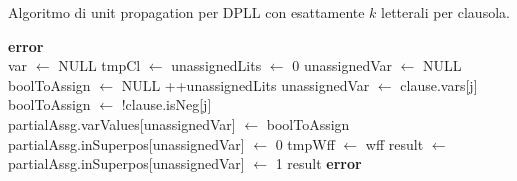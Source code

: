 \begin{algorithm}[H]
    \caption{Algoritmo di unit propagation per DPLL con esattamente $k$ letterali per clausola.}
    \label{alg:unit_propagation_second_approach}
    \begin{algorithmic}[1]
                \State \textbf{error}
            \EndIf\\
            
            \State var $\gets$ NULL
            \State tmpCl $\gets$ 
                    \State unassignedLits $\gets$ 0
                    \State unassignedVar $\gets$ NULL
                    \State boolToAssign $\gets$ NULL
                            \State ++unassignedLits
                            \State unassignedVar $\gets$ clause.vars[j]
                            \State boolToAssign $\gets$ !clause.isNeg[j]
                        \EndIf
                    \EndFor\\
                    
                        \State partialAssg.varValues[unassignedVar] $\gets$ boolToAssign
                        \State partialAssg.inSuperpos[unassignedVar] $\gets$ 0
                        \State tmpWff $\gets$ wff
                        \State {}
                        \State result $\gets$ 
                        \State partialAssg.inSuperpos[unassignedVar] $\gets$ 1
                        \State \Return result
                    \EndIf
                \EndIf
                \State {}
            \EndFor
            \State \textbf{error}
        \EndProcedure
    \end{algorithmic}
\end{algorithm}

